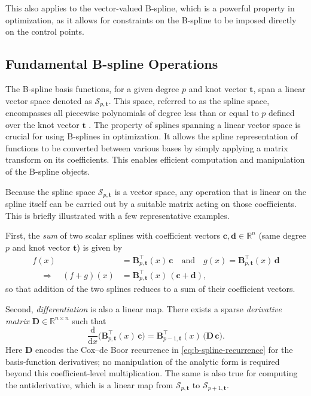 This also applies to the vector-valued B-spline, which is a powerful property in optimization, as it allows for constraints on the B-spline to be imposed directly on the control points.


\subsection{Fundamental B-spline Operations}
\label{sec:b-spline-operations-theory}
The B-spline basis functions, for a given degree $p$ and knot vector $\mathbf{t}$, span a linear vector space denoted as $\mathcal{S}_{p, \mathbf{t}}$. This space, referred to as the spline space, encompasses all piecewise polynomials of degree less than or equal to $p$ defined over the knot vector $\mathbf{t}$ \citep{Grimstad2016}. The property of splines spanning a linear vector space is crucial for using B-splines in optimization. 
It allows the spline representation of functions to be converted between various bases by simply applying a matrix transform on its coefficients. This enables efficient computation and manipulation of the B-spline objects.

Because the spline space $\mathcal{S}_{p,\mathbf{t}}$ is a vector space, any operation that is linear on the spline itself can be carried out by a suitable matrix acting on those coefficients.  This is briefly illustrated with a few representative examples.

First, the \emph{sum} of two scalar splines with coefficient vectors $\mathbf{c},\mathbf{d}\in\mathbb R^n$ (same degree $p$ and knot vector $\mathbf{t}$) is given by
\begin{equation}
    \begin{aligned}
        f(x) &= \mathbf{B}_{p,\mathbf{t}}^\top(x)\,\mathbf{c}
        \quad\text{and}\quad
        g(x) = \mathbf{B}_{p,\mathbf{t}}^\top(x)\,\mathbf{d} \\
        \quad\Longrightarrow\quad
        (f+g)(x)
        &= \mathbf{B}_{p,\mathbf{t}}^\top(x)\,(\mathbf{c}+\mathbf{d})\!,
    \end{aligned}
\end{equation}
so that addition of the two splines reduces to a sum of their coefficient vectors.  

Second, \emph{differentiation} is also a linear map.  There exists a sparse \emph{derivative matrix} $\mathbf{D}\in\mathbb R^{n\times n}$ such that
\begin{equation}
  \frac{\mathrm{d}}{\mathrm{d}x}\bigl(\mathbf{B}_{p,\mathbf{t}}^\top(x)\,\mathbf{c}\bigr)
  = \mathbf{B}_{p-1,\mathbf{t}}^\top(x)\,\bigl(\mathbf{D}\,\mathbf{c}\bigr).
\end{equation}
Here $\mathbf{D}$ encodes the Cox–de Boor recurrence in \cref{eq:b-spline-recurrence} for the basis‐function derivatives; no manipulation of the analytic form is required beyond this coefficient‐level multiplication. The same is also true for computing the antiderivative, which is a linear map from $\mathcal{S}_{p,\mathbf{t}}$ to $\mathcal{S}_{p+1,\mathbf{t}}$.

